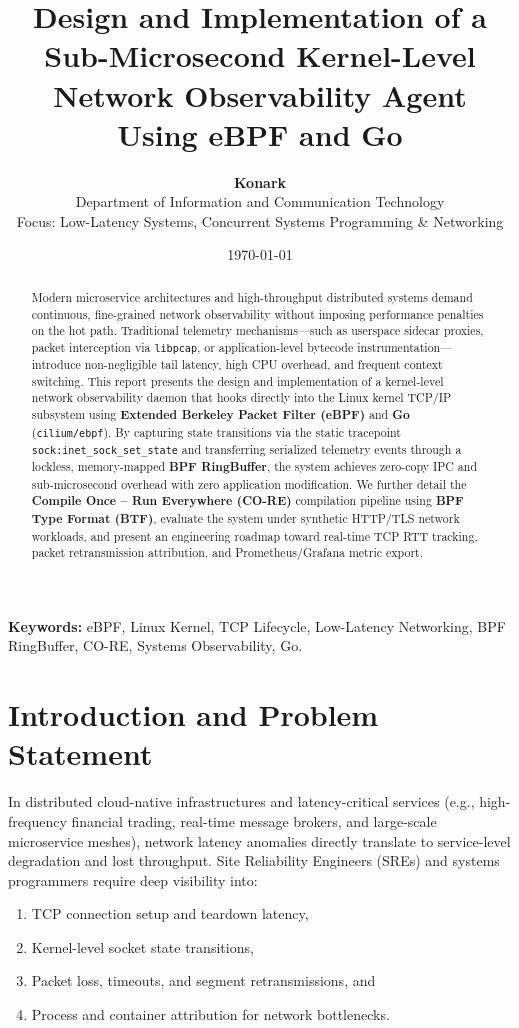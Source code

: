 \documentclass[11pt,a4paper]{article}
\title{\textbf{Design and Implementation of a Sub-Microsecond Kernel-Level Network Observability Agent Using eBPF and Go}}
\author{\textbf{Konark} \\
Department of Information and Communication Technology \\
Focus: Low-Latency Systems, Concurrent Systems Programming \& Networking}
\date{\today}
\begin{document}
\maketitle

\begin{abstract}
Modern microservice architectures and high-throughput distributed systems demand continuous, fine-grained network observability without imposing performance penalties on the hot path. Traditional telemetry mechanisms---such as userspace sidecar proxies, packet interception via \texttt{libpcap}, or application-level bytecode instrumentation---introduce non-negligible tail latency, high CPU overhead, and frequent context switching. This report presents the design and implementation of a kernel-level network observability daemon that hooks directly into the Linux kernel TCP/IP subsystem using \textbf{Extended Berkeley Packet Filter (eBPF)} and \textbf{Go} (\texttt{cilium/ebpf}). By capturing state transitions via the static tracepoint \texttt{sock:inet\_sock\_set\_state} and transferring serialized telemetry events through a lockless, memory-mapped \textbf{BPF RingBuffer}, the system achieves zero-copy IPC and sub-microsecond overhead with zero application modification. We further detail the \textbf{Compile Once -- Run Everywhere (CO-RE)} compilation pipeline using \textbf{BPF Type Format (BTF)}, evaluate the system under synthetic HTTP/TLS network workloads, and present an engineering roadmap toward real-time TCP RTT tracking, packet retransmission attribution, and Prometheus/Grafana metric export.
\end{abstract}

\vspace{1em}
\noindent\textbf{Keywords:} eBPF, Linux Kernel, TCP Lifecycle, Low-Latency Networking, BPF RingBuffer, CO-RE, Systems Observability, Go.

\section{Introduction and Problem Statement}

In distributed cloud-native infrastructures and latency-critical services (e.g., high-frequency financial trading, real-time message brokers, and large-scale microservice meshes), network latency anomalies directly translate to service-level degradation and lost throughput. Site Reliability Engineers (SREs) and systems programmers require deep visibility into:
\begin{enumerate}
    \item TCP connection setup and teardown latency,
    \item Kernel-level socket state transitions,
    \item Packet loss, timeouts, and segment retransmissions, and
    \item Process and container attribution for network bottlenecks.
\end{enumerate}
\end{document}
